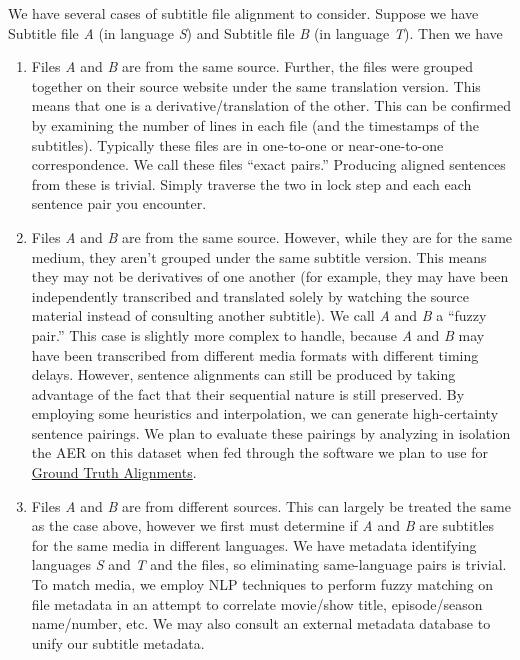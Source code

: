 \documentclass[twoside,twocolumn]{article}
\begin{document}
We have several cases of subtitle file alignment to consider. Suppose we have
Subtitle file \textit{A} (in language \textit{S}) and Subtitle file \textit{B}
(in language \textit{T}). Then we have

\begin{enumerate}

    \item Files \textit{A} and \textit{B} are from the same source. Further,
        the files were grouped together on their source website under the same
        translation version. This means that one is a derivative/translation
        of the other. This can be confirmed by examining the number of lines
        in each file (and the timestamps of the subtitles). Typically these
        files are in one-to-one or near-one-to-one correspondence. We call
        these files ``exact pairs.'' Producing aligned sentences from these is
        trivial. Simply traverse the two in lock step and each each sentence
        pair you encounter.

    \item Files \textit{A} and \textit{B} are from the same source. However,
        while they are for the same medium, they aren't grouped under the
        same subtitle version. This means they may not be derivatives of
        one another (for example, they may have been independently transcribed
        and translated solely by watching the source material instead of
        consulting another subtitle). We call \textit{A} and \textit{B} a
        ``fuzzy pair.'' This case is slightly more complex to handle, because
        \textit{A} and \textit{B} may have been transcribed from different
        media formats with different timing delays. However, sentence
        alignments can still be produced by taking advantage of the fact that
        their sequential nature is still preserved. By employing some
        heuristics and interpolation, we can generate high-certainty sentence
        pairings. We plan to evaluate these pairings by analyzing in isolation
        the AER on this dataset when fed through the software we plan to use
        for \hyperref[subsec:ground-truth-alignments]{Ground Truth Alignments}.

    \item Files \textit{A} and \textit{B} are from different sources. This can
        largely be treated the same as the case above, however we first must
        determine if \textit{A} and \textit{B} are subtitles for the same media
        in different languages. We have metadata identifying languages
        \textit{S} and \textit{T} and the files, so eliminating same-language
        pairs is trivial. To match media, we employ NLP techniques to perform
        fuzzy matching on file metadata in an attempt to correlate movie/show
        title, episode/season name/number, etc. We may also consult an external
        metadata database to unify our subtitle metadata.

\end{enumerate}
\end{document}

